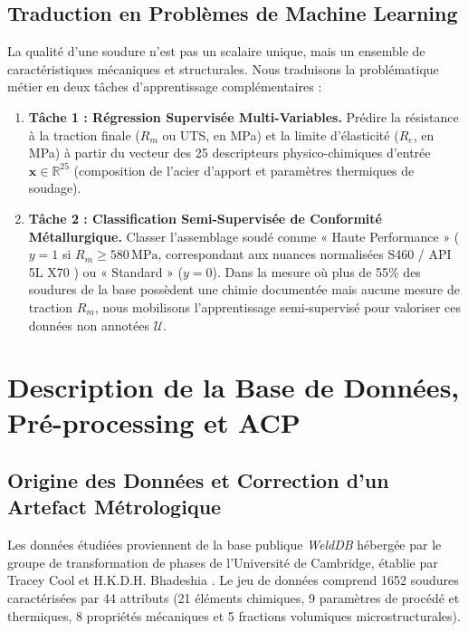\documentclass[11pt,a4paper]{article}
\begin{document}
\subsection{Traduction en Problèmes de Machine Learning}
La qualité d'une soudure n'est pas un scalaire unique, mais un ensemble de caractéristiques mécaniques et structurales. Nous traduisons la problématique métier en deux tâches d'apprentissage complémentaires :
\begin{enumerate}
    \item \textbf{Tâche 1 : Régression Supervisée Multi-Variables.} Prédire la résistance à la traction finale ($R_m$ ou UTS, en MPa) et la limite d'élasticité ($R_e$, en MPa) à partir du vecteur des 25 descripteurs physico-chimiques d'entrée $\mathbf{x} \in \mathbb{R}^{25}$ (composition de l'acier d'apport et paramètres thermiques de soudage).
    \item \textbf{Tâche 2 : Classification Semi-Supervisée de Conformité Métallurgique.} Classer l'assemblage soudé comme « Haute Performance » ($y = 1$ si $R_m \ge 580\,\text{MPa}$, correspondant aux nuances normalisées S460 / API 5L X70 \cite{api2018}) ou « Standard » ($y = 0$). Dans la mesure où plus de 55\% des soudures de la base possèdent une chimie documentée mais aucune mesure de traction $R_m$, nous mobilisons l'apprentissage semi-supervisé pour valoriser ces données non annotées $\mathcal{U}$.
\end{enumerate}

\section{Description de la Base de Données, Pré-processing et ACP}
\label{sec:data_acp}

\subsection{Origine des Données et Correction d'un Artefact Métrologique}
Les données étudiées proviennent de la base publique \textit{WeldDB} hébergée par le groupe de transformation de phases de l'Université de Cambridge, établie par Tracey Cool et H.K.D.H. Bhadeshia \cite{cool1996, cool1997}. Le jeu de données comprend 1652 soudures caractérisées par 44 attributs (21 éléments chimiques, 9 paramètres de procédé et thermiques, 8 propriétés mécaniques et 5 fractions volumiques microstructurales).
\end{document}

